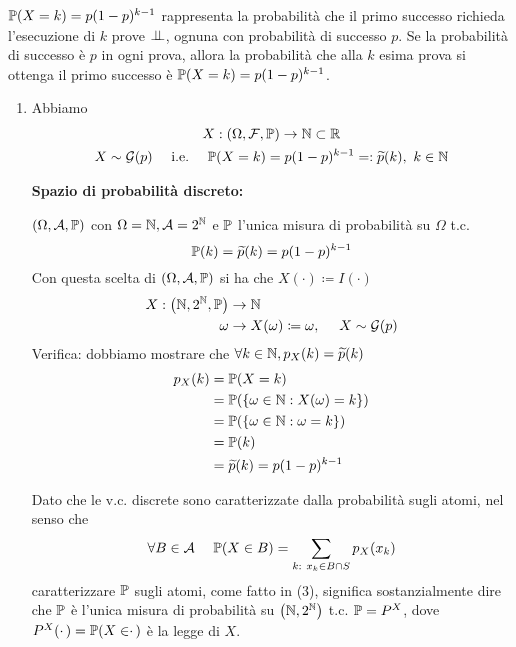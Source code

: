 \begin{oss}
$\mathbb{P}(X=k) =p(1-p)^{k-1}$ rappresenta la probabilità che il primo successo richieda l'esecuzione di $k$ prove $\perp \!\!\! \perp $, ognuna con probabilità di successo $p$. Se la probabilità di successo è $p$ in ogni prova, allora la probabilità che alla $k$ esima prova si ottenga il primo successo è $\mathbb{P}(X=k) =p(1-p)^{k-1}$.
\end{oss}
\begin{enumerate}
\item Abbiamo
\begin{gather*}
X:(\Omega ,\mathcal{F} ,\mathbb{P})\rightarrow \mathbb{N} \subset \mathbb{R}\\
X\sim \mathcal{G}(p) \ \ \ \ \text{i.e.} \ \ \ \ \mathbb{P}(X=k) =p(1-p)^{k-1} =:\widetilde{p}(k) ,\ k\in \mathbb{N}
\end{gather*}

\textbf{Spazio di probabilità discreto:}

$(\Omega,\mathcal{A},\mathbb{P})$ con $\Omega =\mathbb{N} ,\mathcal{A} =2^{\mathbb{N}}$ e $\mathbb{P}$ l'unica misura di probabilità su $\Omega $ t.c.
\begin{equation}
\mathbb{P}(k) =\widetilde{p}(k) =p(1-p)^{k-1}
\end{equation}
Con questa scelta di $(\Omega,\mathcal{A},\mathbb{P})$ si ha che $X(\cdotp) \coloneqq I(\cdotp)$
\begin{align*}
X:\left(\mathbb{N} ,2^{\mathbb{N}} ,\mathbb{P}\right) & \rightarrow \mathbb{N}\\
\omega  & \rightarrow X(\omega) \coloneqq \omega ,\ \ \ \ X\sim \mathcal{G}(p)
\end{align*}
Verifica: dobbiamo mostrare che $\forall k\in \mathbb{N} ,p_{X}(k) =\widetilde{p}(k)$
\begin{align*}
p_{X}(k) & =\mathbb{P}(X=k)\\
 & =\mathbb{P}(\{\omega \in \mathbb{N} :X(\omega) =k\})\\
 & =\mathbb{P}(\{\omega \in \mathbb{N} :\omega =k\})\\
 & =\mathbb{P}(k)\\
 & =\widetilde{p}(k) =p(1-p)^{k-1}
\end{align*}

\begin{oss}
Dato che le v.c. discrete sono caratterizzate dalla probabilità sugli atomi, nel senso che
\begin{equation*}
\forall B\in \Ac \ \ \ \ \PP(X\in B) =\sum\limits_{k:\ x_{k} \in B\cap S} p_{X}(x_{k})
\end{equation*}
caratterizzare $\mathbb{P}$ sugli atomi, come fatto in (3), significa sostanzialmente dire che $\mathbb{P}$ è l'unica misura di probabilità su $\left(\mathbb{N} ,2^{\mathbb{N}}\right)$ t.c. $\mathbb{P} =P^{X}$, dove $P^{X}(\cdotp) =\mathbb{P}(X\in \cdotp)$ è la legge di $X$.


\end{oss}
\end{enumerate}
